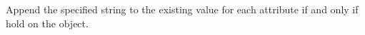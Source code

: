 Append the specified string to the existing value for each attribute if and only
if  hold on the object.



